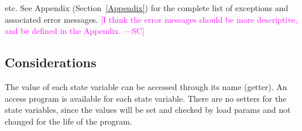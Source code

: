 \documentclass[12pt, titlepage]{article}
\newcommand{\authornote}[3]{\textcolor{#1}{[#3 ---#2]}}
\newcommand{\authornote}[3]{}
\newcommand{\sam}[1]{\authornote{magenta}{SC}{#1}}
\begin{document}
etc.  See Appendix (Section~\ref{Appendix}) for the complete list of exceptions 
and associated error messages. \sam{I think the error messages should be more 
descriptive, and be defined in the Appendix.}

\subsection{Considerations}

The value of each state variable can be accessed through its name (getter).  An
access program is available for each state variable.  There are no setters for
the state variables, since the values will be set and checked by load params and
not changed for the life of the program.

\newpage








\end{document}
